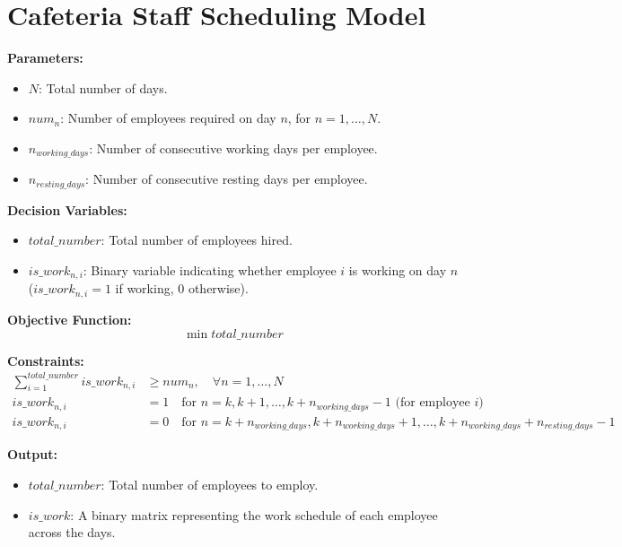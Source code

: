 \documentclass{article}
\begin{document}
\section*{Cafeteria Staff Scheduling Model}

\textbf{Parameters:}
\begin{itemize}
    \item $N$: Total number of days.
    \item $num_n$: Number of employees required on day $n$, for $n = 1, \ldots, N$.
    \item $n_{working\_days}$: Number of consecutive working days per employee.
    \item $n_{resting\_days}$: Number of consecutive resting days per employee.
\end{itemize}

\textbf{Decision Variables:}
\begin{itemize}
    \item $total\_number$: Total number of employees hired.
    \item $is\_work_{n, i}$: Binary variable indicating whether employee $i$ is working on day $n$ ($is\_work_{n, i} = 1$ if working, $0$ otherwise).
\end{itemize}

\textbf{Objective Function:}
\[
\min total\_number
\]

\textbf{Constraints:}
\begin{align*}
    \sum_{i=1}^{total\_number} is\_work_{n, i} & \geq num_n, \quad \forall n = 1, \ldots, N \\
    is\_work_{n, i} & = 1 \quad \text{for } n = k, k+1, \ldots, k+n_{working\_days} - 1 \text{ (for employee $i$)} \\
    is\_work_{n, i} & = 0 \quad \text{for } n = k+n_{working\_days}, k+n_{working\_days}+1, \ldots, k+n_{working\_days}+n_{resting\_days} - 1
\end{align*}

\textbf{Output:}
\begin{itemize}
    \item $total\_number$: Total number of employees to employ.
    \item $is\_work$: A binary matrix representing the work schedule of each employee across the days.
\end{itemize}
\end{document}
